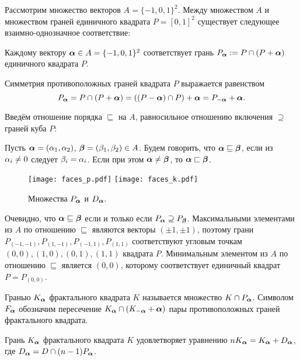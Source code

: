 Рассмотрим множество векторов $A=\{-1,0,1\}^2$.
Между множеством $A$ и множеством граней единичного квадрата $P=[0,1]^2$ существует следующее взаимно-однозначное соответствие:

\begin{definition}\label{dfn:Pa}
Каждому вектору ${\bm{\alpha}}\in A=\{-1,0,1\}^2$ соответствует грань $P_{\bm{\alpha}}:=P\cap(P+{\bm{\alpha}})$ единичного квадрата $P$.
\end{definition}

Симметрия противоположных граней квадрата $P$ выражается равенством 
$$P_{\bm{\alpha}}=P\cap(P+{\bm{\alpha}})=((P-{\bm{\alpha}})\cap P)+{\bm{\alpha}}=P_{-{\bm{\alpha}}}+{\bm{\alpha}}.$$


Введём отношение порядка $\sqsubseteq$ на $A$, равносильное отношению включения $\supseteq$ граней куба $P$:

\begin{definition}\label{Aorder}
Пусть ${\bm{\alpha}}=(\alpha_1,\alpha_2)$, ${\bm{\beta}}=(\beta_1,\beta_2)\in A$.
Будем говорить, что ${\bm{\alpha}}\sqsubseteq{\bm{\beta}}$, если из $\alpha_i\neq 0$ следует $\beta_i=\alpha_i$.
Если при этом ${\bm{\alpha}}\neq{\bm{\beta}}$, то ${\bm{\alpha}}\sqsubset{\bm{\beta}}$.
\end{definition}

\begin{figure}[h!]
 \centering
 \texttt{[image: faces\_p.pdf]}
 \hfill
 \texttt{[image: faces\_k.pdf]}
 \caption{Множества $P_{\bm{\alpha}}$ и $D_{\bm{\alpha}}.$}
 \label{fig:faces}
\end{figure}

Очевидно, что ${\bm{\alpha}}\sqsubseteq{\bm{\beta}}$ если и только если $P_{\bm{\alpha}}\supseteq P_{\bm{\beta}}$. 
Максимальными элементами из $A$ по отношению $\sqsubseteq$ являются векторы $(\pm 1,\pm 1)$, поэтому грани $P_{(-1,-1)}, P_{(1,-1)}, P_{(-1,1)}, P_{(1,1)}$ соответствуют угловым точкам $(0,0), (1,0), (0,1), (1,1)$ квадрата $P$.
Минимальным элементом из $A$ по отношению $\sqsubseteq$ является $(0,0)$, которому соответствует единичный квадрат $P=P_{(0,0)}$.

\begin{definition}\label{def-falpha}
Гранью $K_{\bm{\alpha}}$ фрактального квадрата $K$ называется множество $K\cap P_{\bm{\alpha}}$.
Символом $F_{\bm{\alpha}}$ обозначим пересечение $K_{\bm{\alpha}}\cap(K_{-{\bm{\alpha}}}+{\bm{\alpha}})$ пары противоположных граней фрактального квадрата.
\end{definition}

\begin{proposition}\label{prop:Ka}
Грань $K_{\bm{\alpha}}$ фрактального квадрата $K$ удовлетворяет уравнению $n K_{\bm{\alpha}}=K_{\bm{\alpha}}+D_{\bm{\alpha}}$, где $D_{\bm{\alpha}}=D\cap(n-1)P_{\bm{\alpha}}$.
\end{proposition}


